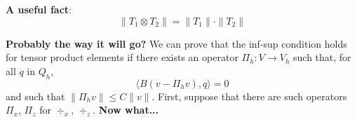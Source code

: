 \documentclass{article}
\theoremstyle{definition}
\theoremstyle{plain}
\renewcommand{\div}[1]{\operatorname{div} #1} %
\begin{document}
\textbf{A useful fact}:
\begin{equation}
    \|T_1 \otimes T_2\| = \|T_1\|\cdot\|T_2\|
\end{equation}

\textbf{Probably the way it will go?}
We can prove that the inf-sup condition holds for tensor product elements if there exists an operator $\Pi_h : V \to V_h$ such that, for all $q$ in $Q_h$,
\begin{equation}
    \langle B(v - \Pi_hv), q\rangle = 0
\end{equation}
and such that $\|\Pi_hv\| \le C\|v\|$.
First, suppose that there are such operators $\Pi_x$, $\Pi_z$ for $\div_x$, $\div_z$.
\textbf{Now what...}

\pagebreak



\end{document}

